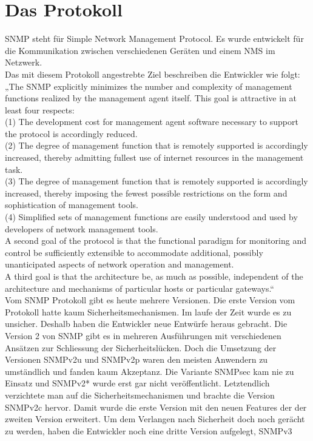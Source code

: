 \documentclass[11pt,a4paper]{article}
\begin{document}
\section{Das Protokoll}
SNMP steht für Simple Network Management Protocol. Es wurde entwickelt für die Kommunikation zwischen verschiedenen Geräten und einem NMS im Netzwerk.\\
\emptyline
Das mit diesem Protokoll angestrebte Ziel beschreiben die Entwickler wie folgt:\\
„The SNMP explicitly minimizes the number and complexity of management functions realized by the management agent itself.  This goal is attractive in at least four respects:\\
      (1)  The development cost for management agent software necessary to support the protocol is 	accordingly reduced.\\
      (2)  The degree of management function that is remotely supported is accordingly increased, 	thereby admitting fullest use of internet resources in the management task.\\
      (3)  The degree of management function that is remotely supported is accordingly increased, 	thereby imposing the fewest possible restrictions on the form and sophistication of 		management tools.\\
      (4)  Simplified sets of management functions are easily understood and used by developers of 	network management tools.\\
\emptyline
A second goal of the protocol is that the functional paradigm for monitoring and control be sufficiently extensible to accommodate additional, possibly unanticipated aspects of network operation and management.\\
\emptyline
A third goal is that the architecture be, as much as possible, independent of the architecture and mechanisms of particular hosts or particular gateways.“
\cite{rfcSnmpGoals}\\
\emptyline
Vom SNMP Protokoll gibt es heute mehrere Versionen. Die erste Version vom Protokoll hatte kaum Sicherheitsmechanismen. Im laufe der Zeit wurde es zu unsicher. Deshalb haben die Entwickler neue Entwürfe heraus gebracht. Die Version 2 von SNMP gibt es in mehreren Ausführungen mit verschiedenen Ansätzen zur Schliessung der Sicherheitslücken. Doch die Umsetzung der Versionen SNMPv2u und SNMPv2p waren den meisten Anwendern zu umständlich und fanden kaum Akzeptanz. Die Variante SNMPsec kam nie zu Einsatz und SNMPv2* wurde erst gar nicht veröffentlicht. Letztendlich verzichtete man auf die Sicherheitsmechanismen und brachte die Version SNMPv2c hervor. Damit wurde die erste Version mit den neuen Features der der zweiten Version erweitert. Um dem Verlangen nach Sicherheit doch noch gerächt zu werden, haben die Entwickler noch eine dritte Version aufgelegt, SNMPv3\\
\end{document}
